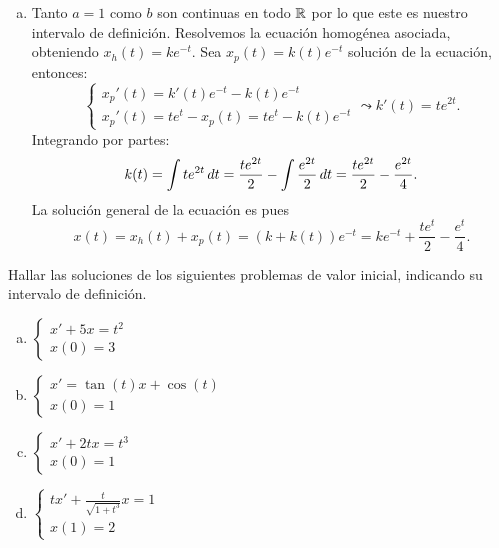 \documentclass[../ecuaciones_diferenciales.tex]{subfiles}
\begin{document}
\begin{solution}
\begin{enumerate}[(a), wide, labelwidth=0pt, labelindent=0pt]
		\item Tanto \(a = 1\) como \(b\) son continuas en todo \(\mathbb{R}\) por lo que
		      este es nuestro intervalo de definición. Resolvemos la ecuación
		      homogénea asociada, obteniendo \(x_h(t) = k e^{-t}\). Sea
		      \(x_p(t) = k(t) e^{-t}\) solución de la ecuación, entonces:
		      \[\begin{cases}
				      x_p'(t) = k'(t) e^{-t} - k(t) e^{-t} \\
				      x_p'(t) = t e^t - x_p(t) = t e^t - k(t) e^{-t}
			      \end{cases}
			      \leadsto
			      k'(t) = t e^{2t}.
		      \]
		      Integrando por partes:
		      \[k(t) = \int t e^{2t} \mathop{d\!} t
			      = \frac{t e^{2t}}{2} - \int \frac{e^{2t}}{2} \mathop{d\!} t
			      = \frac{t e^{2t}}{2} - \frac{e^{2t}}{4}.\]
		      La solución general de la ecuación es pues
		      \[x(t) = x_h(t) + x_p(t) = (k + k(t))e^{-t}
			      = k e^{-t} + \frac{t e^{t}}{2} - \frac{e^{t}}{4}.\]
	\end{enumerate}
\end{solution}

\begin{problem}
Hallar las soluciones de los siguientes problemas de valor inicial,
indicando su intervalo de definición.
\begin{multicols}{2}
	\begin{enumerate}[(a)]
		\item \(\displaystyle
		      \begin{cases}
			      x' + 5x = t^2 \\
			      x(0) = 3
		      \end{cases}\)

		\item \(\displaystyle
		      \begin{cases}
			      x' = \tan(t)x + \cos(t) \\
			      x(0) = 1
		      \end{cases}\)

		\item \(\displaystyle
		      \begin{cases}
			      x' + 2tx = t^3 \\
			      x(0) = 1
		      \end{cases}\)

		\item \(\displaystyle
		      \begin{cases}
			      tx' + \frac{t}{\sqrt{1 + t^3}}x = 1 \\
			      x(1) = 2
		      \end{cases}\)
	\end{enumerate}
\end{multicols}
\end{problem}
\end{document}

